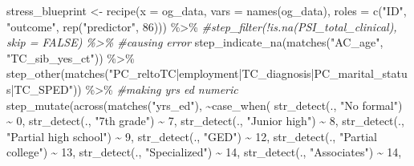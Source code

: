 \documentclass[
]{article}
\newenvironment{Shaded}{\begin{snugshade}}{\end{snugshade}}
\newcommand{\AttributeTok}[1]{\textcolor[rgb]{0.77,0.63,0.00}{#1}}
\newcommand{\CommentTok}[1]{\textcolor[rgb]{0.56,0.35,0.01}{\textit{#1}}}
\newcommand{\DecValTok}[1]{\textcolor[rgb]{0.00,0.00,0.81}{#1}}
\newcommand{\FunctionTok}[1]{\textcolor[rgb]{0.00,0.00,0.00}{#1}}
\newcommand{\NormalTok}[1]{#1}
\newcommand{\OtherTok}[1]{\textcolor[rgb]{0.56,0.35,0.01}{#1}}
\newcommand{\SpecialCharTok}[1]{\textcolor[rgb]{0.00,0.00,0.00}{#1}}
\newcommand{\StringTok}[1]{\textcolor[rgb]{0.31,0.60,0.02}{#1}}
\begin{document}
\begin{Shaded}
\begin{Highlighting}[]
\NormalTok{stress\_blueprint }\OtherTok{\textless{}{-}} \FunctionTok{recipe}\NormalTok{(}\AttributeTok{x =}\NormalTok{ og\_data, }
                    \AttributeTok{vars =} \FunctionTok{names}\NormalTok{(og\_data),}
                    \AttributeTok{roles =} \FunctionTok{c}\NormalTok{(}\StringTok{"ID"}\NormalTok{, }\StringTok{"outcome"}\NormalTok{, }\FunctionTok{rep}\NormalTok{(}\StringTok{"predictor"}\NormalTok{, }\DecValTok{86}\NormalTok{))) }\SpecialCharTok{\%\textgreater{}\%} 
                    \CommentTok{\#step\_filter(!is.na(PSI\_total\_clinical), skip = FALSE) \%\textgreater{}\% \#causing error }
                    \FunctionTok{step\_indicate\_na}\NormalTok{(}\FunctionTok{matches}\NormalTok{(}\StringTok{"AC\_age"}\NormalTok{, }\StringTok{"TC\_sib\_yes\_ct"}\NormalTok{)) }\SpecialCharTok{\%\textgreater{}\%}
                    \FunctionTok{step\_other}\NormalTok{(}\FunctionTok{matches}\NormalTok{(}\StringTok{"PC\_reltoTC|employment|TC\_diagnosis|PC\_marital\_status|TC\_SPED"}\NormalTok{)) }\SpecialCharTok{\%\textgreater{}\%}
  \CommentTok{\#making yrs ed numeric}
                    \FunctionTok{step\_mutate}\NormalTok{(}\FunctionTok{across}\NormalTok{(}\FunctionTok{matches}\NormalTok{(}\StringTok{"yrs\_ed"}\NormalTok{), }\SpecialCharTok{\textasciitilde{}}\FunctionTok{case\_when}\NormalTok{(}
                    \FunctionTok{str\_detect}\NormalTok{(., }\StringTok{"No formal"}\NormalTok{) }\SpecialCharTok{\textasciitilde{}} \DecValTok{0}\NormalTok{,}
                    \FunctionTok{str\_detect}\NormalTok{(., }\StringTok{"7th grade"}\NormalTok{) }\SpecialCharTok{\textasciitilde{}} \DecValTok{7}\NormalTok{, }
                    \FunctionTok{str\_detect}\NormalTok{(., }\StringTok{"Junior high"}\NormalTok{) }\SpecialCharTok{\textasciitilde{}} \DecValTok{8}\NormalTok{,}
                    \FunctionTok{str\_detect}\NormalTok{(., }\StringTok{"Partial high school"}\NormalTok{) }\SpecialCharTok{\textasciitilde{}} \DecValTok{9}\NormalTok{,}
                    \FunctionTok{str\_detect}\NormalTok{(., }\StringTok{"GED"}\NormalTok{) }\SpecialCharTok{\textasciitilde{}} \DecValTok{12}\NormalTok{,}
                    \FunctionTok{str\_detect}\NormalTok{(., }\StringTok{"Partial college"}\NormalTok{) }\SpecialCharTok{\textasciitilde{}} \DecValTok{13}\NormalTok{,}
                    \FunctionTok{str\_detect}\NormalTok{(., }\StringTok{"Specialized"}\NormalTok{) }\SpecialCharTok{\textasciitilde{}} \DecValTok{14}\NormalTok{,}
                    \FunctionTok{str\_detect}\NormalTok{(., }\StringTok{"Associates"}\NormalTok{) }\SpecialCharTok{\textasciitilde{}} \DecValTok{14}\NormalTok{,}

\end{Highlighting}
\end{Shaded}
\end{document}
